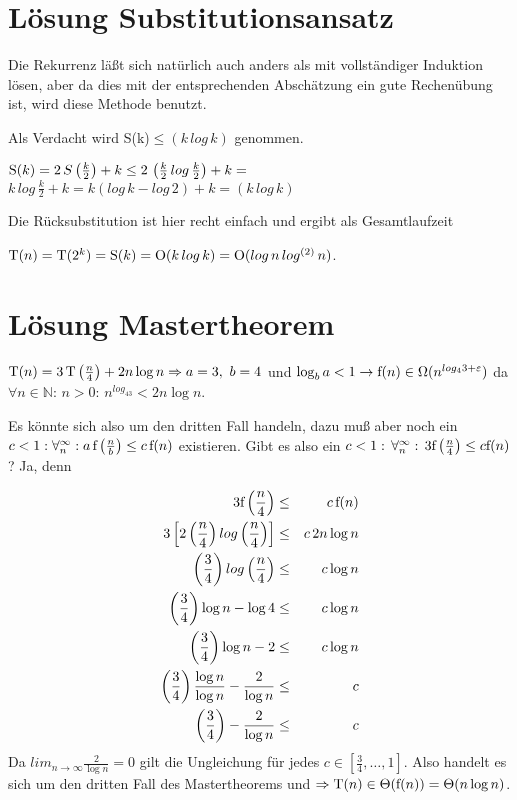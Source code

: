 \documentclass{scrreprt}%
\theoremstyle{break}
\begin{document}
\section{Lösung Substitutionsansatz}
\label{lsg_substitutionsansatz}

Die Rekurrenz läßt sich natürlich auch anders als mit vollständiger Induktion lösen, aber da dies mit der entsprechenden Abschätzung ein
gute Rechenübung ist, wird diese Methode benutzt.

Als Verdacht wird S(k)$\leq(k\, log\,k)$ genommen.

\noindent
\(\textup{S}(k) = 2\, S\left(\frac{k}{2}\right)+k\leq 2\, \left(\frac{k}{2}\, log\, \frac{k}{2}\right)+k=\)
\(k\, log\, \frac{k}{2}+k=k \left(log\, k-log\,2\right)+k=(k\, log\,k)\)

Die Rücksubstitution ist hier recht einfach und ergibt als Gesamtlaufzeit

$\textup{T}(n)=\textup{T}(2^k)=\textup{S}(k)=\textup{O}(k\, log\,k)=\textup{O}(log\,n\, log^{(2)}\, n)$.

\section{Lösung Mastertheorem}
\label{mastertheorem_Fall3}

\( \textup{T}(n) = 3 \, \textup{T}\left(\frac{n}{4}\right) + 2n\log n \Rightarrow a=3,\ b=4\) und \(\log_ba<1 \rightarrow 
\textup{f}(n) \in \Omega(n^{log_43+\varepsilon})\) da \(\forall n \in \mathbb{N}:\,n>0:\,n^{log_43}<2n\log n\).

Es könnte sich also um den dritten Fall handeln, dazu muß aber noch ein \(c < 1 : \forall^{\infty}_{n}:
a \, \textup{f}\left(\frac{n}{b}\right)  \leq c \, \textup{f}(n)\) existieren. Gibt es also ein 
\(c<1:\, \forall^{\infty}_{n}:\, 3\textup{f}\left(\frac{n}{4}\right) \leq c\textup{f}(n)\)? Ja, denn

\begin{eqnarray*}
3\textup{f}\left(\frac{n}{4}\right) & \leq & c\,\textup{f}(n)\\
3\left[2\left(\frac{n}{4}\right) log \left(\frac{n}{4}\right)\right] & \leq & c\, 2n \log n\\
\left(\frac{3}{4}\right) log \left(\frac{n}{4}\right) & \leq & c \log n\\
\left(\frac{3}{4}\right) \log n- \log 4 & \leq & c \log n\\
\left(\frac{3}{4}\right) \log n- 2 & \leq & c \log n\\
\left(\frac{3}{4}\right) \frac{\log n}{\log n}-\frac{2}{\log n} & \leq & c\\
\left(\frac{3}{4}\right) -\frac{2}{\log n} & \leq & c
\end{eqnarray*}
Da \(lim_{n \to \infty} \frac{2}{\log n}=0\) gilt die Ungleichung für jedes \(c \in [\frac{3}{4},\ldots,1]\). %
Also handelt es sich um den dritten Fall des Mastertheorems und 
\( \Rightarrow \textup{T}(n) \in \Theta (\textup{f}(n))=\Theta (n\log n)\).
\end{document}
